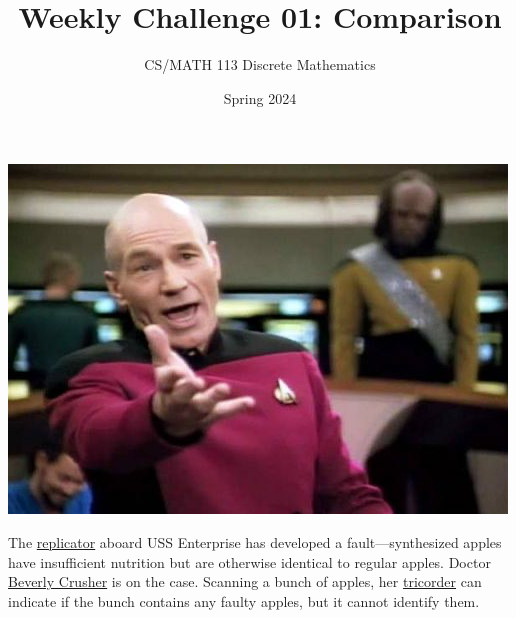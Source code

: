 \documentclass[a4paper]{exam}
\title{Weekly Challenge 01: Comparison}
\author{CS/MATH 113 Discrete Mathematics}
\date{Spring 2024}
\begin{document}
\maketitle

\begin{questions}
  
  \begin{minipage}{.3\linewidth}
  \centerline{\includegraphics[width=\textwidth]{picard}}
\end{minipage}
\begin{minipage}{.65\linewidth}
  The \href{https://en.wikipedia.org/wiki/Replicator_(Star_Trek)}{replicator} aboard USS Enterprise has developed a fault---synthesized apples have insufficient nutrition but are otherwise identical to regular apples. Doctor \href{https://memory-alpha.fandom.com/wiki/Beverly_Crusher}{Beverly Crusher} is on the case. Scanning a bunch of apples, her \href{https://en.wikipedia.org/wiki/Medical_tricorder}{tricorder} can indicate if the bunch contains any faulty apples, but it cannot identify them.
\end{minipage}


\end{questions}
\end{document}
